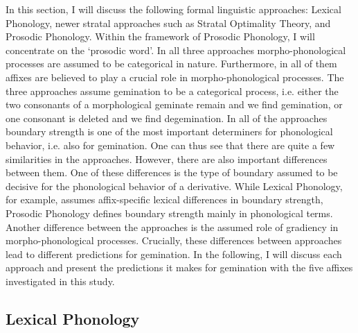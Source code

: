 In this section, I will discuss the following formal linguistic approaches: Lexical Phonology, newer stratal approaches such as Stratal Optimality Theory, and Prosodic Phonology. Within the framework of Prosodic Phonology, I will concentrate on the `prosodic word'.  In all three approaches morpho-phonological processes are assumed to be categorical in nature. Furthermore, in all of them affixes are believed to play a crucial role in morpho-phonological processes. The three approaches assume gemination to be a categorical process, i.e. either the two consonants of a morphological geminate remain and we find gemination, or one consonant is deleted and we find degemination. In all of the approaches boundary strength is one of the most important determiners for phonological behavior, i.e. also for gemination. 
One can thus see that there are quite a few similarities in the approaches. However, there are also important differences between them. One of these differences is the type of boundary assumed to be decisive for the phonological behavior of a derivative. While Lexical Phonology, for example, assumes affix-specific lexical differences in boundary strength, Prosodic Phonology defines boundary strength mainly in phonological terms. 
Another difference between the approaches is the assumed role of gradiency in morpho-phonological processes.
Crucially, these differences between approaches lead to different predictions for gemination. In the following, I will discuss each approach and present the predictions it makes for gemination with the five affixes investigated in this study.


\subsection{Lexical Phonology} \label{LexPhon}


